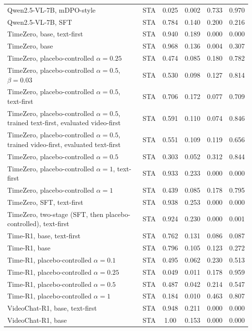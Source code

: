 \begin{table}[!htbp]
\begin{tabular}{@{}>{\raggedright\arraybackslash}p{5.8cm}ccccc@{}}
Qwen2.5-VL-7B, mDPO-style & STA & 0.025 & 0.002 & 0.733 & 0.970 \\
Qwen2.5-VL-7B, SFT & STA & 0.784 & 0.140 & 0.200 & 0.216 \\
TimeZero, base, text-first & STA & 0.940 & 0.189 & 0.000 & 0.000 \\
TimeZero, base & STA & 0.968 & 0.136 & 0.004 & 0.307 \\
TimeZero, placebo-controlled $\alpha{=}0.25$ & STA & 0.474 & 0.085 & 0.180 & 0.782 \\
TimeZero, placebo-controlled $\alpha{=}0.5$, $\beta{=}0.03$ & STA & 0.530 & 0.098 & 0.127 & 0.814 \\
TimeZero, placebo-controlled $\alpha{=}0.5$, text-first & STA & 0.706 & 0.172 & 0.077 & 0.709 \\
TimeZero, placebo-controlled $\alpha{=}0.5$, trained text-first, evaluated video-first & STA & 0.591 & 0.110 & 0.074 & 0.846 \\
TimeZero, placebo-controlled $\alpha{=}0.5$, trained video-first, evaluated text-first & STA & 0.551 & 0.109 & 0.119 & 0.656 \\
TimeZero, placebo-controlled $\alpha{=}0.5$ & STA & 0.303 & 0.052 & 0.312 & 0.844 \\
TimeZero, placebo-controlled $\alpha{=}1$, text-first & STA & 0.933 & 0.233 & 0.000 & 0.000 \\
TimeZero, placebo-controlled $\alpha{=}1$ & STA & 0.439 & 0.085 & 0.178 & 0.795 \\
TimeZero, SFT, text-first & STA & 0.938 & 0.253 & 0.000 & 0.000 \\
TimeZero, two-stage (SFT, then placebo-controlled), text-first & STA & 0.924 & 0.230 & 0.000 & 0.001 \\
Time-R1, base, text-first & STA & 0.762 & 0.131 & 0.086 & 0.087 \\
Time-R1, base & STA & 0.796 & 0.105 & 0.123 & 0.272 \\
Time-R1, placebo-controlled $\alpha{=}0.1$ & STA & 0.495 & 0.062 & 0.230 & 0.513 \\
Time-R1, placebo-controlled $\alpha{=}0.25$ & STA & 0.049 & 0.011 & 0.178 & 0.959 \\
Time-R1, placebo-controlled $\alpha{=}0.5$ & STA & 0.487 & 0.042 & 0.214 & 0.547 \\
Time-R1, placebo-controlled $\alpha{=}1$ & STA & 0.184 & 0.010 & 0.463 & 0.807 \\
VideoChat-R1, base, text-first & STA & 0.948 & 0.211 & 0.000 & 0.000 \\
VideoChat-R1, base & STA & 1.00 & 0.153 & 0.000 & 0.000 \\

\end{tabular}
\end{table}

